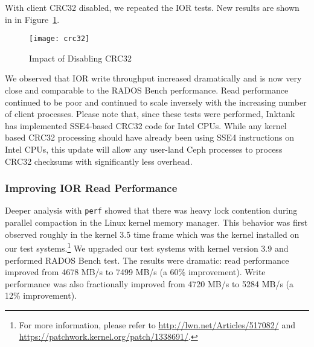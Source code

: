 With client CRC32 disabled, we repeated the IOR tests. New results are shown in
in Figure~\ref{fig:ior-no-client-crc32}. 

\begin{figure}[htb]
\centering
\texttt{[image: crc32]}
\caption{Impact of Disabling CRC32}
\label{fig:ior-no-client-crc32}
\end{figure}

We observed that IOR write throughput increased dramatically and is now very
close and comparable to the RADOS Bench performance. Read performance continued
to be poor and continued to scale inversely with the increasing number of
client processes.  Please note that, since these tests were performed, Inktank
has implemented SSE4-based CRC32 code for Intel CPUs.  While any kernel based
CRC32 processing should have already been using SSE4 instructions on Intel
CPUs, this update will allow any user-land Ceph processes to process CRC32
checksums with significantly less overhead.

\subsubsection{Improving IOR Read Performance}

Deeper analysis with \verb!perf! showed that there was heavy lock contention
during parallel compaction in the Linux kernel memory manager.  This behavior
was first observed roughly in the kernel 3.5 time frame which was the kernel
installed on our test systems.\footnote{For more information,
please refer to \url{http://lwn.net/Articles/517082/} and
\url{https://patchwork.kernel.org/patch/1338691/}.}  We upgraded our test
systems with kernel version 3.9 and performed RADOS Bench test.  The results
were dramatic:  read performance improved from 4678 MB/s to 7499 MB/s 
(a 60\% improvement).  Write performance was also fractionally improved from
4720 MB/s to 5284 MB/s (a 12\% improvement).





